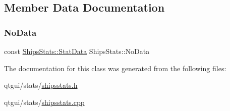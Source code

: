 \subsection{Member Data Documentation}
\mbox{\label{class_ships_stats_a9976669d2378aeebbb769356fda7018c}} 
\subsubsection{\texorpdfstring{NoData}{NoData}}
{\footnotesize\ttfamily const \mbox{\hyperlink{struct_ships_stats_1_1_stat_data}{Ships\+Stats\+::\+Stat\+Data}} Ships\+Stats\+::\+No\+Data\hspace{0.3cm}{\ttfamily [static]}}



The documentation for this class was generated from the following files\+:\begin{DoxyCompactItemize}
\item 
qtgui/stats/\mbox{\hyperlink{shipsstats_8h}{shipsstats.\+h}}\item 
qtgui/stats/\mbox{\hyperlink{shipsstats_8cpp}{shipsstats.\+cpp}}\end{DoxyCompactItemize}
